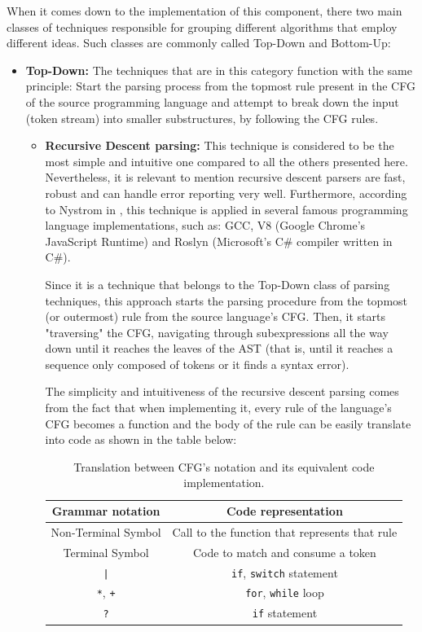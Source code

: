 When it comes down to the implementation of this component, there two main classes of techniques responsible for grouping different algorithms that employ different ideas. Such classes are commonly called Top-Down and Bottom-Up:
\begin{itemize}
    \item \textbf{Top-Down:} The techniques that are in this category function with the same principle: Start the parsing process from the topmost rule present in the CFG of the source programming language and attempt to break down the input (token stream) into smaller substructures, by following the CFG rules.
        \begin{itemize}
            \item \textbf{Recursive Descent parsing:} This technique is considered to be the most simple and intuitive one compared to all the others presented here. Nevertheless, it is relevant to mention recursive descent parsers are fast, robust and can handle error reporting very well. Furthermore, according to Nystrom in \cite{nystrom2021crafting}, this technique is applied in several famous programming language implementations, such as: GCC, V8 (Google Chrome's JavaScript Runtime) and Roslyn (Microsoft's C\# compiler written in C\#).
            
            Since it is a technique that belongs to the Top-Down class of parsing techniques, this approach starts the parsing procedure from the topmost (or outermost) rule from the source language's CFG. Then, it starts "traversing" the CFG, navigating through subexpressions all the way down until it reaches the leaves of the AST (that is, until it reaches a sequence only composed of tokens or it finds a syntax error).

            The simplicity and intuitiveness of the recursive descent parsing comes from the fact that when implementing it, every rule of the language's CFG becomes a function and the body of the rule can be easily translate into code as shown in the table below:

            \begin{table}[h!]
                \centering
                \begin{tabular}{|c|c|}
                    \hline
                    \textbf{Grammar notation} & \textbf{Code representation} \\
                    \hline
                    Non-Terminal Symbol & Call to the function that represents that rule \\
                    Terminal Symbol & Code to match and consume a token \\
                    \texttt{|} & \texttt{if}, \texttt{switch} statement  \\
                    \texttt{*}, \texttt{+} & \texttt{for}, \texttt{while} loop \\
                    \texttt{?} & \texttt{if} statement \\
                    \hline
                \end{tabular}
                \caption{Translation between CFG's notation and its equivalent code implementation.}
            \end{table}


\end{itemize}
\end{itemize}
